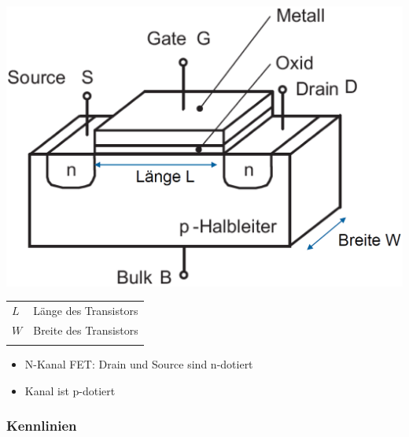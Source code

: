 \begin{minipage}[t]{0.35\columnwidth}
    \includegraphics[align=c, width=\columnwidth]{images/mos_fet_aufbau.png}
\end{minipage}
\hfill
\begin{minipage}[c]{0.6\columnwidth}
    \begin{tabular}{l l}
        $L$ & Länge des Transistors  \\
        $W$ & Breite des Transistors \\
        \\
    \end{tabular}

    \begin{itemize}
        \item N-Kanal FET: Drain und Source sind n-dotiert
        \item Kanal ist p-dotiert
    \end{itemize}
\end{minipage}


\subsubsection{Kennlinien}

